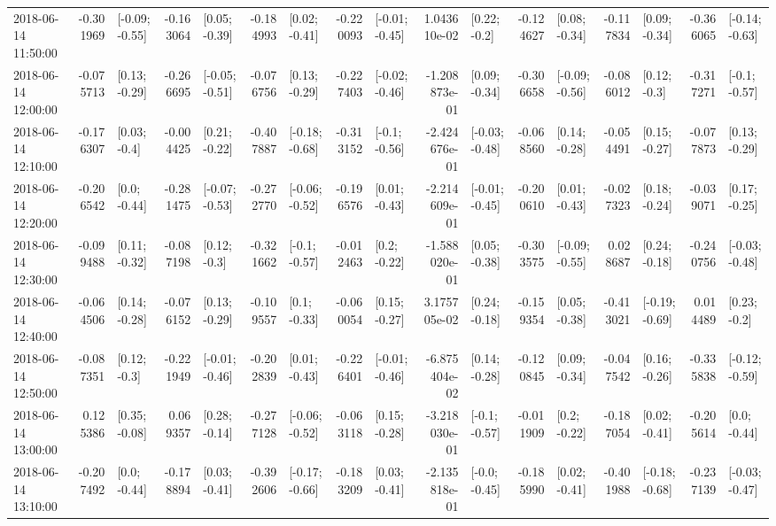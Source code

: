 \begin{tabular}{lrlrlrlrlrlrlrlrl}
2018-06-14 11:50:00 & -0.301969 &  [-0.09; -0.55] & -0.163064 &   [0.05; -0.39] & -0.184993 &   [0.02; -0.41] & -0.220093 &  [-0.01; -0.45] &  1.043610e-02 &    [0.22; -0.2] & -0.124627 &   [0.08; -0.34] & -0.117834 &   [0.09; -0.34] & -0.366065 &  [-0.14; -0.63] \\
2018-06-14 12:00:00 & -0.075713 &   [0.13; -0.29] & -0.266695 &  [-0.05; -0.51] & -0.076756 &   [0.13; -0.29] & -0.227403 &  [-0.02; -0.46] & -1.208873e-01 &   [0.09; -0.34] & -0.306658 &  [-0.09; -0.56] & -0.086012 &    [0.12; -0.3] & -0.317271 &   [-0.1; -0.57] \\
2018-06-14 12:10:00 & -0.176307 &    [0.03; -0.4] & -0.004425 &   [0.21; -0.22] & -0.407887 &  [-0.18; -0.68] & -0.313152 &   [-0.1; -0.56] & -2.424676e-01 &  [-0.03; -0.48] & -0.068560 &   [0.14; -0.28] & -0.054491 &   [0.15; -0.27] & -0.077873 &   [0.13; -0.29] \\
2018-06-14 12:20:00 & -0.206542 &    [0.0; -0.44] & -0.281475 &  [-0.07; -0.53] & -0.272770 &  [-0.06; -0.52] & -0.196576 &   [0.01; -0.43] & -2.214609e-01 &  [-0.01; -0.45] & -0.200610 &   [0.01; -0.43] & -0.027323 &   [0.18; -0.24] & -0.039071 &   [0.17; -0.25] \\
2018-06-14 12:30:00 & -0.099488 &   [0.11; -0.32] & -0.087198 &    [0.12; -0.3] & -0.321662 &   [-0.1; -0.57] & -0.012463 &    [0.2; -0.22] & -1.588020e-01 &   [0.05; -0.38] & -0.303575 &  [-0.09; -0.55] &  0.028687 &   [0.24; -0.18] & -0.240756 &  [-0.03; -0.48] \\
2018-06-14 12:40:00 & -0.064506 &   [0.14; -0.28] & -0.076152 &   [0.13; -0.29] & -0.109557 &    [0.1; -0.33] & -0.060054 &   [0.15; -0.27] &  3.175705e-02 &   [0.24; -0.18] & -0.159354 &   [0.05; -0.38] & -0.413021 &  [-0.19; -0.69] &  0.014489 &    [0.23; -0.2] \\
2018-06-14 12:50:00 & -0.087351 &    [0.12; -0.3] & -0.221949 &  [-0.01; -0.46] & -0.202839 &   [0.01; -0.43] & -0.226401 &  [-0.01; -0.46] & -6.875404e-02 &   [0.14; -0.28] & -0.120845 &   [0.09; -0.34] & -0.047542 &   [0.16; -0.26] & -0.335838 &  [-0.12; -0.59] \\
2018-06-14 13:00:00 &  0.125386 &   [0.35; -0.08] &  0.069357 &   [0.28; -0.14] & -0.277128 &  [-0.06; -0.52] & -0.063118 &   [0.15; -0.28] & -3.218030e-01 &   [-0.1; -0.57] & -0.011909 &    [0.2; -0.22] & -0.187054 &   [0.02; -0.41] & -0.205614 &    [0.0; -0.44] \\
2018-06-14 13:10:00 & -0.207492 &    [0.0; -0.44] & -0.178894 &   [0.03; -0.41] & -0.392606 &  [-0.17; -0.66] & -0.183209 &   [0.03; -0.41] & -2.135818e-01 &   [-0.0; -0.45] & -0.185990 &   [0.02; -0.41] & -0.401988 &  [-0.18; -0.68] & -0.237139 &  [-0.03; -0.47] \\

\end{tabular}
